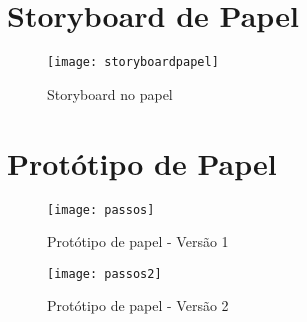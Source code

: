 \begin{apendicesenv}

\partapendices
\chapter{Storyboard de Papel}

\begin{figure}[!htb]
 \centering
 \texttt{[image: storyboardpapel]}
 \caption{Storyboard no papel}
 \label{Rotulo}

\end{figure}

\chapter{Protótipo de Papel}

\begin{figure}[!htb]
 \centering
 \texttt{[image: passos]}
 \caption{Protótipo de papel - Versão 1}
 \label{Rotulo}

\end{figure}

\begin{figure}[!htb]
 \centering
 \texttt{[image: passos2]}
 \caption{Protótipo de papel - Versão 2}
 \label{Rotulo}

\end{figure}

\end{apendicesenv}
